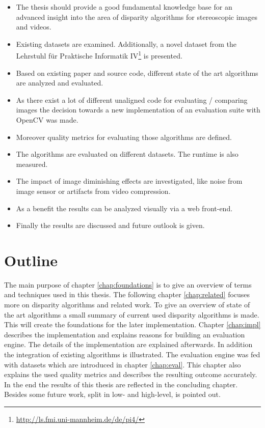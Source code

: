 \begin{itemize}
	\item The thesis should provide a good fundamental knowledge base for an advanced insight into the area of disparity algorithms for stereoscopic images and videos.
	\item Existing datasets are examined. Additionally, a novel dataset from the Lehrstuhl f{\"u}r Praktische Informatik IV\footnote{\url{http://ls.fmi.uni-mannheim.de/de/pi4/}} is presented.
	\item Based on existing paper and source code, different state of the art algorithms are analyzed and evaluated.
	\item As there exist a lot of different unaligned code for evaluating / comparing images the decision towards a new implementation of an evaluation suite with OpenCV was made.
	\item Moreover quality metrics for evaluating those algorithms are defined.
	\item The algorithms are evaluated on different datasets. The runtime is also measured.
	\item The impact of image diminishing effects are investigated, like noise from image sensor or artifacts from video compression.
	\item As a benefit the results can be analyzed visually via a web front-end.
	\item Finally the results are discussed and future outlook is given.
\end{itemize}

\section{Outline}

The main purpose of chapter \ref{chap:foundations} is to give an overview of terms and techniques used in this thesis.
The following chapter \ref{chap:related} focuses more on disparity algorithms and related work.
To give an overview of state of the art algorithms a small summary of current used disparity algorithms is made.
This will create the foundations for the later implementation.
Chapter \ref{chap:impl} describes the implementation and explains reasons for building an evaluation engine.
The details of the implementation are explained afterwards.
In addition the integration of existing algorithms is illustrated.
The evaluation engine was fed with datasets which are introduced in chapter \ref{chap:eval}.
This chapter also explains the used quality metrics and describes the resulting outcome accurately.
In the end the results of this thesis are reflected in the concluding chapter.
Besides some future work, split in low- and high-level, is pointed out.
